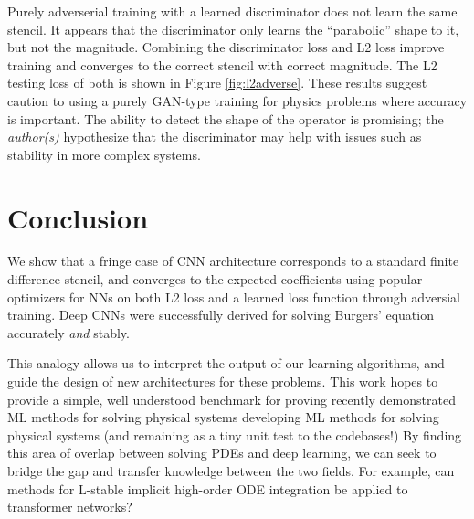 \documentclass{article}
\begin{document}
Purely adverserial training with a learned discriminator does not learn the same stencil. It appears that the discriminator only learns the ``parabolic'' shape to it, but not the magnitude. Combining the discriminator loss and L2 loss improve training and converges to the correct stencil with correct magnitude. The L2 testing loss of both is shown in Figure \ref{fig:l2adverse}.
These results suggest caution to using a purely GAN-type training for physics problems where accuracy is important. The ability to detect the shape of the operator is promising; the {\em author(s)} hypothesize that the discriminator may help with issues such as stability in more complex systems.

\section{Conclusion}
\label{sec:conclusion}

We show that a fringe case of CNN architecture corresponds to a standard finite difference stencil, and converges to the expected coefficients using popular optimizers for NNs on both L2 loss and a learned loss function through adversial training.
Deep CNNs were successfully derived for solving Burgers' equation accurately {\em and } stably.



This analogy allows us to interpret the output of our learning algorithms, and guide the design of new architectures for these problems.
This work hopes to provide a simple, well understood benchmark for proving recently demonstrated ML methods for solving physical systems developing ML methods for solving physical systems (and remaining as a tiny unit test to the codebases!)
By finding this area of overlap between solving PDEs and deep learning, we can seek to bridge the gap and transfer knowledge between the two fields. For example, can methods for L-stable implicit high-order ODE integration be applied to transformer networks?




\end{document}
